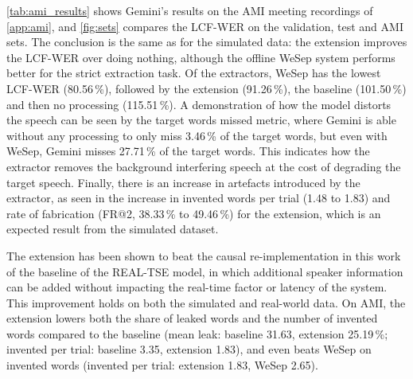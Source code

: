 \autoref{tab:ami_results} shows Gemini's results on the AMI meeting recordings of \autoref{app:ami}, and \autoref{fig:sets} compares the LCF-WER on the validation, test and AMI sets. The conclusion is the same as for the simulated data: the extension improves the LCF-WER over doing nothing, although the offline WeSep system performs better for the strict extraction task. Of the extractors, WeSep has the lowest LCF-WER (80.56\,\%), followed by the extension (91.26\,\%), the baseline (101.50\,\%) and then no processing (115.51\,\%). A demonstration of how the model distorts the speech can be seen by the target words missed metric, where Gemini is able without any processing to only miss 3.46\,\% of the target words, but even with WeSep, Gemini misses 27.71\,\% of the target words. This indicates how the extractor removes the background interfering speech at the cost of degrading the target speech. Finally, there is an increase in artefacts introduced by the extractor, as seen in the increase in invented words per trial (1.48 to 1.83) and rate of fabrication (FR@2, 38.33\,\% to 49.46\,\%) for the extension, which is an expected result from the simulated dataset.


The extension has been shown to beat the causal re-implementation in this work of the baseline of the REAL-TSE model, in which additional speaker information can be added without impacting the real-time factor or latency of the system. This improvement holds on both the simulated and real-world data. On AMI, the extension lowers both the share of leaked words and the number of invented words compared to the baseline (mean leak: baseline 31.63, extension 25.19\,\%; invented per trial: baseline 3.35, extension 1.83), and even beats WeSep on invented words (invented per trial: extension 1.83, WeSep 2.65).
\FloatBarrier
